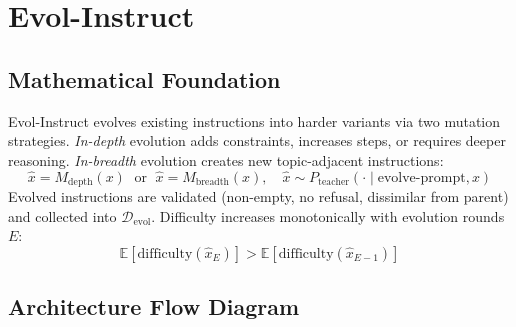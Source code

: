 \newpage
\section{Evol-Instruct}

\subsection{Mathematical Foundation}
Evol-Instruct evolves existing instructions into harder variants via two mutation strategies. \emph{In-depth} evolution adds constraints, increases steps, or requires deeper reasoning. \emph{In-breadth} evolution creates new topic-adjacent instructions:
\begin{equation}
  \hat{x} = M_\text{depth}(x) \;\text{ or }\; \hat{x} = M_\text{breadth}(x), \quad \hat{x} \sim P_{\text{teacher}}(\cdot \mid \text{evolve-prompt}, x)
\end{equation}
Evolved instructions are validated (non-empty, no refusal, dissimilar from parent) and collected into $\mathcal{D}_{\text{evol}}$. Difficulty increases monotonically with evolution rounds $E$:
\begin{equation}
  \mathbb{E}[\text{difficulty}(\hat{x}_E)] > \mathbb{E}[\text{difficulty}(\hat{x}_{E-1})]
\end{equation}

\subsection{Architecture Flow Diagram}


